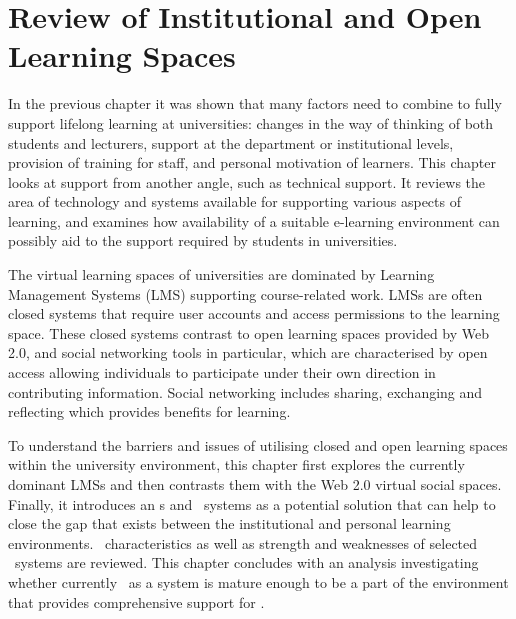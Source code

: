 \chapter{Review of Institutional and Open Learning Spaces \label{cha:systudy}}
In the previous chapter it was shown that many factors need to combine to fully
support lifelong learning at universities: changes in the way of thinking of
both students and lecturers, support at the department or institutional levels,
provision of training for staff, and personal motivation of learners. This
chapter looks at \LLLs support from another angle, such as technical support. It
reviews the area of technology and systems available for supporting various
aspects of learning, and examines how availability of a suitable e-learning
environment can possibly aid to the \LLLs support required by students in
universities.

The virtual learning spaces of universities are dominated by Learning Management
Systems (LMS) supporting course-related work. LMSs are often closed systems that
require user accounts and access permissions to the learning space. These
closed systems contrast to open learning spaces provided by Web 2.0, and social
networking tools in particular, which are characterised by open access allowing
individuals to participate under their own direction in contributing
information. Social networking includes sharing, exchanging and reflecting which
provides benefits for learning. 
 
To understand the barriers and issues of utilising closed and open learning
spaces within the university environment, this chapter first explores the
currently dominant LMSs and then contrasts them with the Web 2.0 virtual social
spaces. Finally, it introduces an \ep s and \ep~systems as a potential solution
that can help to close the gap that exists between the institutional and
personal learning environments. \ep~characteristics as well as strength and
weaknesses of selected \ep~systems are reviewed. This chapter concludes with an
analysis investigating whether currently \ep~as a system is mature enough to be
a part of the environment that provides comprehensive support for \LLLsn.

